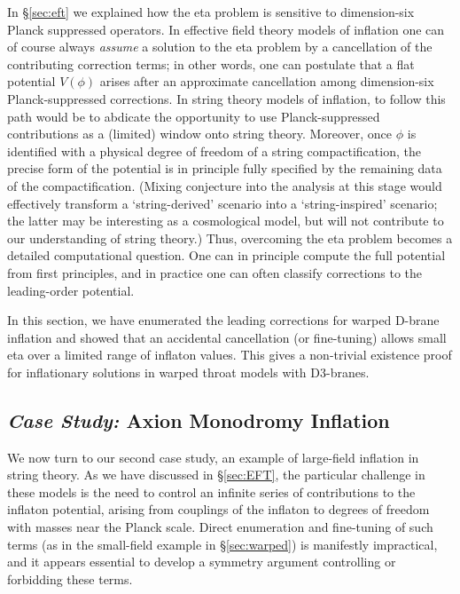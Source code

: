 \documentclass[12pt,letterpaper,rotate]{article}
\begin{document}
{In \S\ref{sec:eft} we explained how the eta problem is sensitive to dimension-six Planck suppressed operators.
In effective field theory models of inflation one can of course always {\it assume} a solution to the eta problem by a cancellation of the contributing correction terms; in other words, one can postulate that a flat potential $V(\phi)$ arises after an approximate cancellation among dimension-six Planck-suppressed corrections.
In string theory models of inflation, to follow this path would be to abdicate the opportunity to use Planck-suppressed contributions as a (limited) window onto string theory.  Moreover, once $\phi$ is identified with a physical degree of freedom of a string compactification,  the precise form of the potential is in principle fully specified  by the remaining data of the compactification. (Mixing conjecture into the analysis at this stage would effectively transform a `string-derived' scenario into a `string-inspired' scenario; the latter may be interesting as a cosmological model, but will not contribute to our understanding of string theory.)
Thus, overcoming the eta problem becomes a detailed computational question.  One can in principle compute the full 
potential from first principles, and in practice one can often %
classify corrections to the leading-order potential.

In this section, we have enumerated the leading corrections for warped D-brane inflation and showed that an accidental cancellation (or fine-tuning) allows small eta over a limited range of inflaton values.
This gives a non-trivial existence proof for inflationary solutions in warped throat models with D3-branes.


\subsection{{\sl Case Study:} Axion Monodromy Inflation}
\label{sec:LargeField} 

We now turn to our second case study, an example of large-field inflation
in string theory.
As we have discussed in \S\ref{sec:EFT}, the particular challenge in these models is the need to control an infinite series of contributions to the inflaton potential, arising from couplings of the inflaton to degrees of freedom with masses near the Planck scale. Direct enumeration and fine-tuning of such terms (as in the small-field example in \S\ref{sec:warped}) is manifestly impractical, and it appears essential to develop a symmetry argument controlling or forbidding these terms.

}
\end{document}
